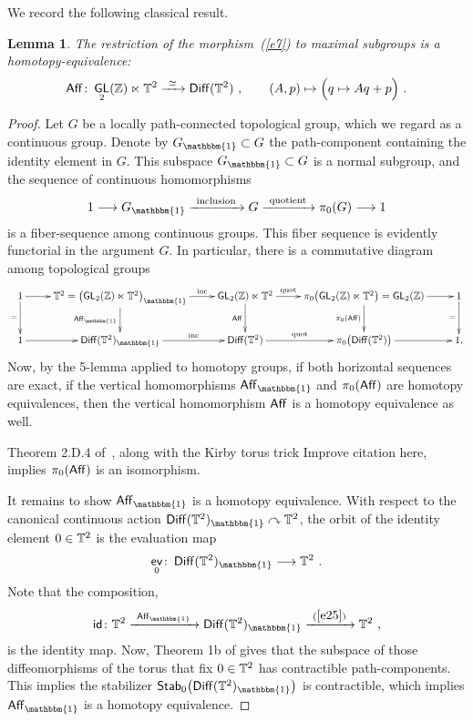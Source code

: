 \documentclass{amsart}
\newtheorem{lemma}[theorem]{Lemma}
\theoremstyle{definition}
\theoremstyle{remark}
\DeclareMathOperator{\ev}{\mathsf{ev}}
\newcommand{\lacts}{\curvearrowright}
\DeclareMathOperator{\Diff}{{\sf Diff}}
\newcommand{\xra}{\xrightarrow}
\DeclareMathOperator{\uno}{\mathbbm{1}}
\DeclareMathOperator{\GL}{\sf GL}
\DeclareMathOperator{\id}{\sf id}
\DeclareMathOperator{\Aff}{\sf Aff}
\begin{document}
We record the following classical result.
\begin{lemma}\label{t1}
The restriction of the morphism~(\ref{e7}) to maximal subgroups is a homotopy-equivalence:
\[
\Aff \colon
 \GL_2(\ZZ) \ltimes \TT^2
\xra{~\simeq~}
\Diff(\TT^2)
~,\qquad
(A, p)
\mapsto
\Bigl(
q\mapsto 
Aq + p
\Bigr)
~.
\]
\end{lemma}


\begin{proof}
Let $G$ be a locally path-connected topological group, which we regard as a continuous group.
Denote by $G_{\uno} \subset G$ the path-component containing the identity element in $G$.
This subspace $G_{\uno}\subset G$ is a normal subgroup, and the sequence of continuous homomorphisms
\[
1
\longrightarrow
G_{\uno}
\xra{~\rm inclusion~}
G
\xra{~\rm quotient~}
\pi_0(G)
\longrightarrow
1
\]
is a fiber-sequence among continuous groups.
This fiber sequence is evidently functorial in the argument $G$.
In particular, there is a commutative diagram among topological groups 
\[
\xymatrix{
1 \ar[d]_-= \ar[r]
&
\TT^{2} = \bigl( \GL_2(\ZZ) \ltimes \TT^{2} \bigr)_{\uno}
\ar[d]_-{\Aff_{\uno}}
\ar[r]^-{\rm inc}
&
\GL_2(\ZZ) \ltimes \TT^{2} 
\ar[d]_-{\Aff} 
\ar[r]^-{\rm quot}
&
\pi_0 \bigl( \GL_2(\ZZ) \ltimes \TT^{2} \bigr)
=
\GL_2(\ZZ)
\ar[d]_-{\pi_0(\Aff)}
\ar[r]
&
1 \ar[d]_-=
\\
1
\ar[r]
&
\Diff(\TT^2)_{\uno}
\ar[r]^-{\rm inc}
&
\Diff(\TT^2) 
\ar[r]^-{\rm quot}
&
\pi_0 \bigl( \Diff(\TT^2) \bigr)
\ar[r]
&
1
.
}
\] 
Now, by the 5-lemma applied to homotopy groups, if both horizontal sequences are exact, if the vertical homomorphisms $\Aff_{\uno}$ and $\pi_0(\Aff)$ are homotopy equivalences, then the vertical homomorphism $\Aff$ is a homotopy equivalence as well.



Theorem 2.D.4 of~\cite{rolf}, along with the Kirby torus trick {\color{red} Improve citation here}, implies $\pi_0(\Aff)$ is an isomorphism.  



It remains to show $\Aff_{\uno}$ is a homotopy equivalence. 
With respect to the canonical continuous action $\Diff(\TT^2)_{\uno} \lacts \TT^2$, 
the orbit of the identity element $0\in \mathbb T^2$ is the evaluation map 
\begin{equation}\label{e25}
\ev_0
\colon 
\Diff(\TT^2)_{\uno}
\longrightarrow
\TT^2
~.
\end{equation}
Note that the composition,
\[
\id
\colon
\TT^2
\xra{~\Aff_{\uno}~}
\Diff(\TT^2)_{\uno}
\xra{~(\ref{e25})~}
\TT^2
~,
\]
is the identity map.
Now, Theorem 1b of \cite{ee} gives that the subspace of those diffeomorphisms of the torus that fix $0\in \mathbb T^2$ has contractible path-components.
This implies the stabilizer ${\sf Stab}_0\bigl(\Diff(\TT^2)_{\uno}\bigr)$ is contractible, which implies $\Aff_{\uno}$ is a homotopy equivalence.  



\end{proof}
\end{document}
